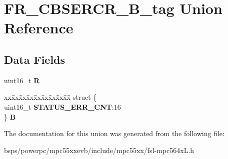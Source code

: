 \hypertarget{unionFR__CBSERCR__16B__tag}{}\section{F\+R\+\_\+\+C\+B\+S\+E\+R\+C\+R\+\_\+B\+\_\+tag Union Reference}
\label{unionFR__CBSERCR__16B__tag}
\subsection*{Data Fields}
\begin{DoxyCompactItemize}
\item 
\mbox{\label{unionFR__CBSERCR__16B__tag_a360cb0af051894268ae3570e11e6d4cb}} 
uint16\+\_\+t {\bfseries R}
\item 
\mbox{\label{unionFR__CBSERCR__16B__tag_a3406c893bf60a0f27e8ace7bc9044b12}} 
\begin{tabbing}
xx\=xx\=xx\=xx\=xx\=xx\=xx\=xx\=xx\=\kill
struct \{\\
\>uint16\_t {\bfseries STATUS\_ERR\_CNT}:16\\
\} {\bfseries B}\\

\end{tabbing}\end{DoxyCompactItemize}


The documentation for this union was generated from the following file\+:\begin{DoxyCompactItemize}
\item 
bsps/powerpc/mpc55xxevb/include/mpc55xx/fsl-\/mpc564x\+L.\+h\end{DoxyCompactItemize}
